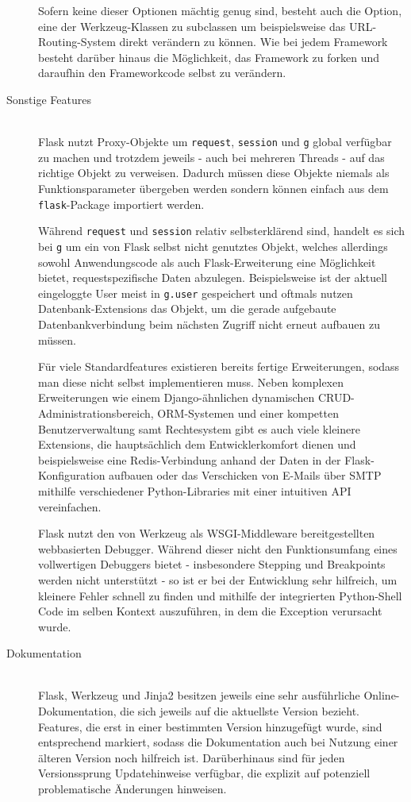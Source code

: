 \begin{description}
Sofern keine dieser Optionen mächtig genug sind, besteht auch die Option, eine der Werkzeug-Klassen
zu subclassen um beispielsweise das URL-Routing-System direkt verändern zu können. Wie bei jedem
Framework besteht darüber hinaus die Möglichkeit, das Framework zu forken und daraufhin den
Frameworkcode selbst zu verändern.


\item[Sonstige Features] \hfill \\
Flask nutzt Proxy-Objekte um \lstinline{request}, \lstinline{session} und \lstinline{g} global
verfügbar zu machen und trotzdem jeweils - auch bei mehreren Threads - auf das richtige Objekt zu
verweisen. Dadurch müssen diese Objekte niemals als Funktionsparameter übergeben werden sondern
können einfach aus dem \lstinline{flask}-Package importiert werden.

Während \lstinline{request} und \lstinline{session} relativ selbsterklärend sind, handelt es sich
bei \lstinline{g} um ein von Flask selbst nicht genutztes Objekt, welches allerdings sowohl
Anwendungscode als auch Flask-Erweiterung eine Möglichkeit bietet, requestspezifische Daten
abzulegen. Beispielsweise ist der aktuell eingeloggte User meist in \lstinline{g.user} gespeichert
und oftmals nutzen Datenbank-Extensions das Objekt, um die gerade aufgebaute Datenbankverbindung
beim nächsten Zugriff nicht erneut aufbauen zu müssen.

Für viele Standardfeatures existieren bereits fertige Erweiterungen, sodass man diese nicht selbst
implementieren muss. Neben komplexen Erweiterungen wie einem Django-ähnlichen dynamischen
CRUD-Administrationsbereich, ORM-Systemen und einer kompetten Benutzerverwaltung samt Rechtesystem
gibt es auch viele kleinere Extensions, die hauptsächlich dem Entwicklerkomfort dienen und
beispielsweise eine Redis-Verbindung anhand der Daten in der Flask-Konfiguration aufbauen oder
das Verschicken von E-Mails über SMTP mithilfe verschiedener Python-Libraries mit einer intuitiven
API vereinfachen.

Flask nutzt den von Werkzeug als WSGI-Middleware bereitgestellten webbasierten Debugger. Während
dieser nicht den Funktionsumfang eines vollwertigen Debuggers bietet - insbesondere Stepping und
Breakpoints werden nicht unterstützt - so ist er bei der Entwicklung sehr hilfreich, um kleinere
Fehler schnell zu finden und mithilfe der integrierten Python-Shell Code im selben Kontext
auszuführen, in dem die Exception verursacht wurde.


\item[Dokumentation] \hfill \\
Flask, Werkzeug und Jinja2 besitzen jeweils eine sehr ausführliche Online-Dokumentation, die sich
jeweils auf die aktuellste Version bezieht. Features, die erst in einer bestimmten Version
hinzugefügt wurde, sind entsprechend markiert, sodass die Dokumentation auch bei Nutzung einer
älteren Version noch hilfreich ist. Darüberhinaus sind für jeden Versionssprung Updatehinweise
verfügbar, die explizit auf potenziell problematische Änderungen hinweisen.


\end{description}

